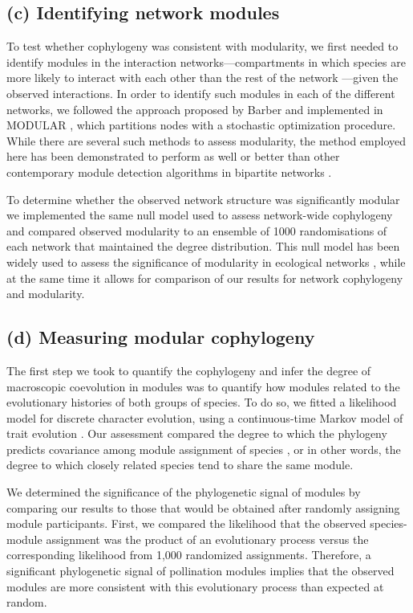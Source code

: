 \documentclass{article}
\begin{document}
\subsection*{(c) Identifying network modules}

	To test whether cophylogeny was consistent with modularity, we first needed to identify modules in the interaction networks---compartments in which species are more likely to interact with each other than the rest of the network \citep{Guimera2010}---given the observed interactions. In order to identify such modules in each of the different networks, we followed the approach proposed by Barber \citep{Barber2007} and implemented in MODULAR \citep{Marquitti2014}, which partitions nodes with a stochastic optimization procedure. While there are several such methods to assess modularity, the method employed here has been demonstrated to perform as well or better than other contemporary  module detection algorithms in bipartite networks \citep{Thebault2013}. 
	
	To determine whether the observed network structure was significantly modular we implemented the same null model used to assess network-wide cophylogeny and compared observed modularity to an ensemble of 1000 randomisations of each network that maintained the degree distribution. This null model has been widely used to assess the significance of modularity in ecological networks \citep{Olesen2007, Fortuna2010}, while at the same time it allows for comparison of our results for network cophylogeny and modularity.

\subsection*{(d) Measuring modular cophylogeny}

The first step we took to quantify the cophylogeny and infer the degree of macroscopic coevolution in modules was to quantify how modules related to the evolutionary histories of both groups of species. To do so, we fitted a likelihood model for discrete character evolution, using a continuous-time Markov model of trait evolution \citep{Fitzjohn2009}. Our assessment compared the degree to which the phylogeny predicts covariance among module assignment of species \citep{Pagel1999}, or in other words, the degree to which closely related species tend to share the same module. 

	We determined the significance of the phylogenetic signal of modules by comparing our results to those that would be obtained after randomly assigning module participants. First, we compared the likelihood that the observed species-module assignment was the product of an evolutionary process versus the corresponding likelihood from 1,000 randomized assignments. Therefore, a significant phylogenetic signal of pollination modules implies that the observed modules are more consistent with this evolutionary process than expected at random.  
\end{document}
